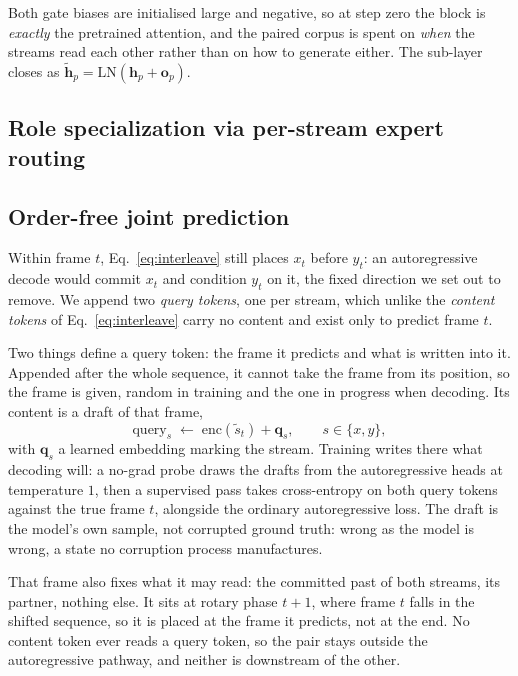 Both gate biases are initialised large and negative, so at step zero
the block is \emph{exactly} the pretrained attention, and the paired
corpus is spent on \emph{when} the streams read each other rather than
on how to generate either. The sub-layer closes as
$\tilde{\mathbf{h}}_p = \mathrm{LN}(\mathbf{h}_p + \mathbf{o}_p)$.

\subsection{Role specialization via per-stream expert routing}


\subsection{Order-free joint prediction}
\label{sec:querytok}

Within frame $t$, Eq.~\eqref{eq:interleave} still places $x_t$ before
$y_t$: an autoregressive decode would commit $x_t$ and condition $y_t$
on it, the fixed direction we set out to remove. We append two
\emph{query tokens}, one per stream, which unlike the \emph{content
tokens} of Eq.~\eqref{eq:interleave} carry no content and exist only to
predict frame $t$.

Two things define a query token: the frame it predicts and what is
written into it. Appended after the whole sequence, it cannot take the
frame from its position, so the frame is given, random in training and
the one in progress when decoding. Its content is a draft of that
frame,
\begin{equation}
  \mathrm{query}_s \;\leftarrow\; \mathrm{enc}(\tilde{s}_t)
  + \mathbf{q}_s,
  \qquad s \in \{x, y\},
  \label{eq:queryinput}
\end{equation}
with $\mathbf{q}_s$ a learned embedding marking the stream. Training
writes there what decoding will: a no-grad probe draws the drafts from
the autoregressive heads at temperature $1$, then a supervised pass
takes cross-entropy on both query tokens against the true frame $t$,
alongside the ordinary autoregressive loss. The draft is the model's
own sample, not corrupted ground truth: wrong as the model is wrong, a
state no corruption process manufactures.

That frame also fixes what it may read: the committed past of both
streams, its partner, nothing else. It sits at rotary phase $t{+}1$,
where frame $t$ falls in the shifted sequence, so it is placed at the
frame it predicts, not at the end. No content token ever reads a query
token, so the pair stays outside the autoregressive pathway, and
neither is downstream of the other.

